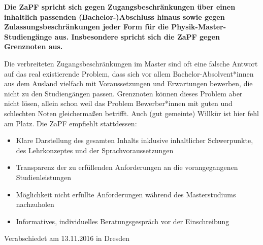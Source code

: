 \documentclass[DIV=calc]{scrartcl}
\begin{document}
\textbf{Die ZaPF spricht sich gegen Zugangsbeschränkungen über einen inhaltlich passenden (Bachelor-)Abschluss hinaus sowie gegen Zulassungsbeschränkungen jeder Form für die Physik-Master-Studiengänge aus. Insbesondere spricht sich die ZaPF gegen Grenznoten aus.}

Die verbreiteten Zugangsbeschränkungen im Master sind oft eine falsche Antwort auf das real existierende Problem, dass sich vor allem Bachelor-Absolvent*innen aus dem Ausland vielfach mit Voraussetzungen und Erwartungen bewerben, die nicht zu den Studiengängen passen. Grenznoten können dieses Problem aber nicht lösen, allein schon weil das Problem Bewerber*innen mit guten und schlechten Noten gleichermaßen betrifft. Auch (gut gemeinte) Willkür ist hier fehl am Platz. Die ZaPF empfiehlt stattdessen: 

\begin{itemize}
\item Klare Darstellung des gesamten Inhalts inklusive inhaltlicher Schwerpunkte, des Lehrkonzeptes und der Sprachvoraussetzungen 
\item Transparenz der zu erfüllenden Anforderungen an die vorangegangenen Studienleistungen 
\item Möglichkeit nicht erfüllte Anforderungen während des Masterstudiums nachzuholen 
\item Informatives, individuelles Beratungsgespräch vor der Einschreibung 
\end{itemize}


\vfill
\begin{flushright}
Verabschiedet am 13.11.2016 in Dresden
\end{flushright}
\end{document}
